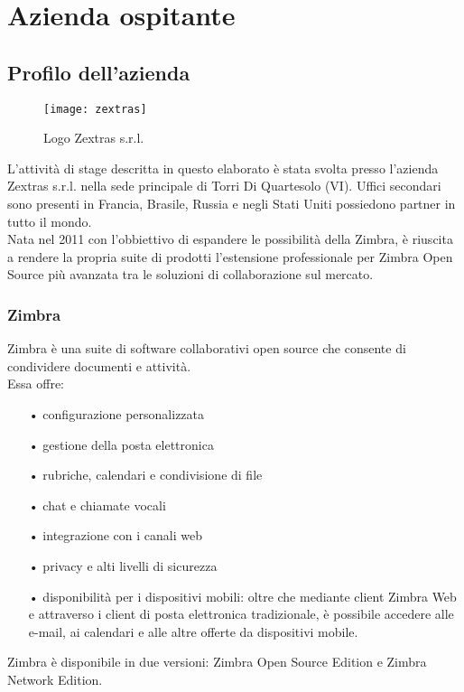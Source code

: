 \chapter{Azienda ospitante}\label{chap:company}

\section{Profilo dell'azienda}
\begin{figure}[H] 
	\centering
	\texttt{[image: zextras]}
	\caption{Logo Zextras s.r.l.}
	\label{fig:modulizextras}
\end{figure}
L'attività di stage descritta in questo elaborato è stata svolta presso l'azienda Zextras s.r.l. nella sede principale di Torri Di Quartesolo (VI). Uffici secondari sono presenti in Francia, Brasile, Russia e negli Stati Uniti possiedono partner in tutto il mondo.\\
Nata nel 2011 con l'obbiettivo di espandere le possibilità della  Zimbra, è riuscita a rendere la propria suite di prodotti l'estensione professionale per Zimbra Open Source più avanzata tra le soluzioni di collaborazione sul mercato. 

\subsection{Zimbra}
Zimbra è una suite di software collaborativi open source che consente di condividere documenti e attività.  \\
Essa offre:
\begin{itemize}
	\item[•] configurazione personalizzata
	\item[•] gestione della posta elettronica
	\item[•] rubriche, calendari e condivisione di file
	\item[•] chat e chiamate vocali
	\item[•] integrazione con i canali web
	\item[•] privacy e alti livelli di sicurezza
	\item[•] disponibilità per i dispositivi mobili: oltre che mediante client Zimbra Web e attraverso i client di posta elettronica tradizionale, è possibile accedere alle e-mail, ai calendari e alle altre offerte da dispositivi mobile. 
\end{itemize}
Zimbra è disponibile in due versioni: Zimbra Open Source Edition e Zimbra Network Edition. 

